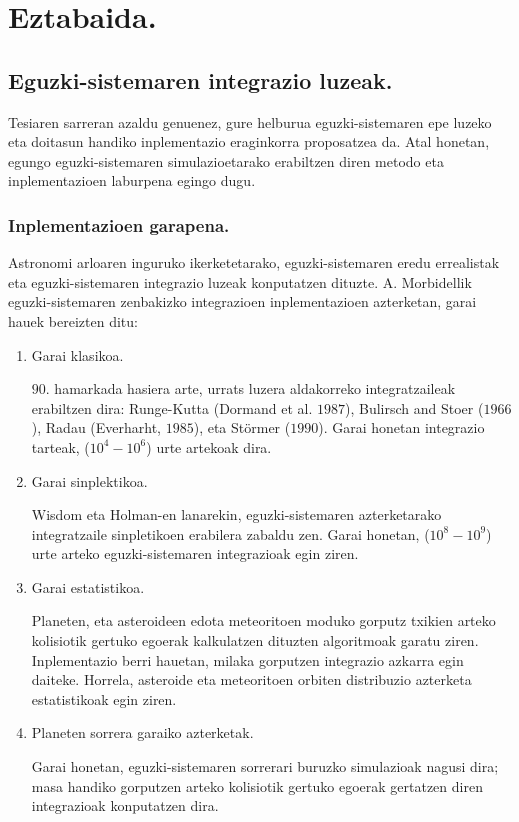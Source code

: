 \chapter{Eztabaida.}

\section{Eguzki-sistemaren integrazio luzeak.}


Tesiaren sarreran azaldu genuenez, gure helburua eguzki-sistemaren epe luzeko eta doitasun handiko inplementazio eraginkorra proposatzea da. Atal honetan, egungo eguzki-sistemaren simulazioetarako erabiltzen diren metodo eta inplementazioen laburpena egingo dugu. 

\subsection*{Inplementazioen garapena.} 

Astronomi arloaren inguruko ikerketetarako, eguzki-sistemaren eredu errealistak eta eguzki-sistemaren integrazio luzeak konputatzen dituzte. A. Morbidellik \cite{Morbidelli2002} eguzki-sistemaren zenbakizko integrazioen inplementazioen azterketan, garai hauek bereizten ditu:
\begin{enumerate}

\item Garai klasikoa.

$90$. hamarkada hasiera arte, urrats luzera aldakorreko integratzaileak erabiltzen dira: Runge-Kutta (Dormand et al. $1987$), Bulirsch and Stoer ($1966$), Radau (Everharht, $1985$), eta Störmer ($1990$). Garai honetan integrazio tarteak, ($10^4-10^6$) urte artekoak dira.  

\item Garai sinplektikoa.

Wisdom eta Holman-en \cite[1991]{Sussman1992} lanarekin, eguzki-sistemaren azterketarako integratzaile sinpletikoen erabilera zabaldu zen. Garai honetan, ($10^8-10^9$) urte arteko eguzki-sistemaren integrazioak egin ziren.  

\item Garai estatistikoa.

Planeten, eta asteroideen edota meteoritoen moduko gorputz txikien  arteko kolisiotik gertuko egoerak kalkulatzen dituzten algoritmoak garatu ziren. Inplementazio berri hauetan, milaka gorputzen integrazio azkarra egin daiteke. Horrela, asteroide eta meteoritoen orbiten distribuzio azterketa estatistikoak egin ziren.

\item Planeten sorrera garaiko azterketak.

Garai honetan, eguzki-sistemaren sorrerari buruzko simulazioak nagusi dira; masa handiko gorputzen arteko kolisiotik gertuko egoerak gertatzen diren integrazioak konputatzen dira. 
 
\end{enumerate}

